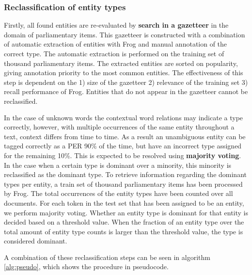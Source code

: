 \subsubsection{Reclassification of entity types}
Firstly, all found entities are re-evaluated by \textbf{search in a gazetteer} in the domain of parliamentary items. This gazetteer is constructed with a combination of automatic extraction of entities with Frog and manual annotation of the correct type. The automatic extraction is performed on the training set of thousand parliamentary items. The extracted entities are sorted on popularity, giving annotation priority to the most common entities. The effectiveness of this step is dependent on the 1) size of the gazetteer 2) relevance of the training set 3) recall performance of Frog. Entities that do not appear in the gazetteer cannot be reclassified.

In the case of unknown words the contextual word relations may indicate a type correctly, however, with multiple occurrences of the same entity throughout a text, context differs from time to time. As a result an unambiguous entity can be tagged correctly as a PER 90\% of the time, but have an incorrect type assigned for the remaining 10\%. This is expected to be resolved using \textbf{majority voting}. In the case when a certain type is dominant over a minority, this minority is reclassified as the dominant type. To retrieve information regarding the dominant types per entity, a train set of thousand parliamentary items has been processed by Frog. The total occurrences of the entity types have been counted over all documents. For each token in the test set that has been assigned to be an entity, we perform majority voting. Whether an entity type is dominant for that entity is decided based on a threshold value. When the fraction of an entity type over the total amount of entity type counts is larger than the threshold value, the type is considered dominant.

A combination of these reclassification steps can be seen in algorithm \ref{alg:pseudo}, which shows the procedure in pseudocode.


